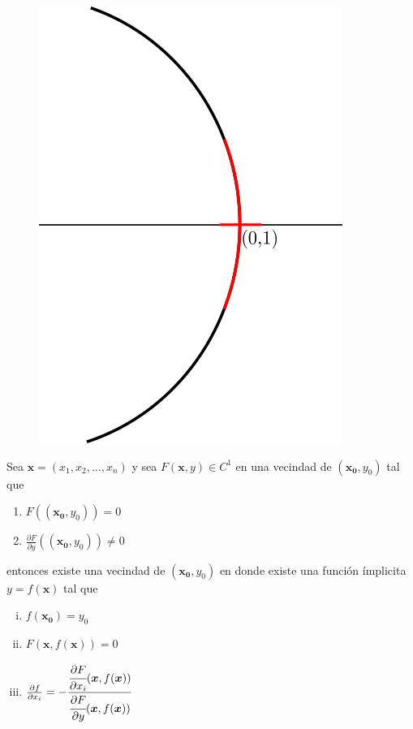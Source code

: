 \documentclass[spanish]{beamer}
\begin{document}
\begin{frame}
\begin{columns}
\begin{center}
        \end{center}
    \end{columns}
\end{frame}

\begin{frame}
    \begin{figure}[ht]
      \begin{center}
      \includegraphics[width=0.5\linewidth]{../gfx/unit-circle3}
      \end{center}
    \end{figure}
\end{frame}

\begin{frame}
    \begin{theorem}
        Sea $\bm{x} = (x_{1},x_{2},\ldots,x_{n})$ y sea $F(\bm{x},y) \in C^{1}$ 
        en una vecindad de $(\bm{x_{0}},y_{0})$ tal que
        \begin{enumerate}
            \item $F((\bm{x_{0}},y_{0})) = 0$
            \item $\frac{\partial F}{\partial y}((\bm{x_{0}},y_{0})) \ne 0$
        \end{enumerate}
        entonces existe una vecindad de $(\bm{x_{0}},y_{0})$ en donde existe una
        funci\'on \'implicita $y=f(\bm{x})$ tal que
        \begin{enumerate}[i.]
            \item $f(\bm{x_{0}}) = y_{0}$
            \item $F(\bm{x}, f(\bm{x})) = 0$
            \item $\frac{\partial f}{\partial x_{i}} = -\cfrac{\cfrac{\partial F}{\partial x_{i}}(\bm{x},f(\bm{x}))}{\cfrac{\partial F}{\partial y}(\bm{x},f(\bm{x}))}$
        \end{enumerate}
    \end{theorem}
\end{frame}
\end{document}
